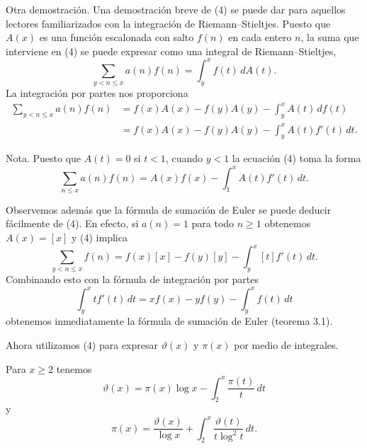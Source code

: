 \documentclass[12pt,a4paper]{book}
\begin{document}
    Otra demostración. Una demostración breve de (4) se puede dar para aquellos
    lectores familiarizados con la integración de Riemann--Stieltjes. Puesto que
    $A(x)$ es una función escalonada con salto $f(n)$ en cada entero $n$, la suma que
    interviene en (4) se puede expresar como una integral de Riemann--Stieltjes,
    \begin{equation*}
        \sum_{y<n\leq x}a(n)f(n)=\int_{y}^{x} f(t)\,dA(t).
    \end{equation*}
    La integración por partes nos proporciona
    \begin{align*}
        \sum_{y<n\leq x}a(n)f(n)&=f(x)A(x)-f(y)A(y)-\int_{y}^{x} A(t)\,df(t)\\
        &=f(x)A(x)-f(y)A(y)-\int_{y}^{x} A(t)f'(t)\,dt.
    \end{align*}

    Nota. Puesto que $A(t)=0$ si $t<1$, cuando $y<1$ la ecuación (4) toma la forma
    \begin{equation}
        \sum_{n\leq x}a(n)f(n)=A(x)f(x)-\int_{1}^{x} A(t)f'(t)\,dt.
    \end{equation}

    Observemos además que la fórmula de sumación de Euler se puede deducir fácilmente
    de (4). En efecto, si $a(n)=1$ para todo $n\geq1$ obtenemos $A(x)=[x]$ y (4)
    implica
    \begin{equation*}
        \sum_{y<n\leq x}f(n)=f(x)[x]-f(y)[y]-\int_{y}^{x}[t]f'(t)\,dt.
    \end{equation*}
    Combinando esto con la fórmula de integración por partes
    \begin{equation*}
        \int_{y}^{x} tf'(t)\,dt=xf(x)-yf(y)-\int_{y}^{x} f(t)\,dt
    \end{equation*}
    obtenemos inmediatamente la fórmula de sumación de Euler (teorema 3.1).

    Ahora utilizamos (4) para expresar $\vartheta(x)$ y $\pi(x)$ por medio de
    integrales.

    \begin{teorema}
        Para $x\geq2$ tenemos
        \begin{equation}
            \vartheta(x)=\pi(x)\log x-\int_{2}^{x}\frac{\pi(t)}{t}\,dt
        \end{equation}
        y
        \begin{equation}
            \pi(x)=\frac{\vartheta(x)}{\log x}+\int_{2}^{x}\frac{\vartheta(t)}{t\log^{2}t}\,dt.
        \end{equation}
    \end{teorema}
\end{document}
